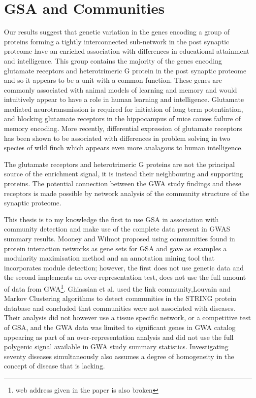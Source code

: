 	
\section{GSA and Communities}
Our results suggest that genetic variation in the genes encoding a group of proteins forming a tightly interconnected sub-network in the post synaptic proteome have an enriched association with differences in educational attainment and intelligence. This group contains the majority of the genes encoding glutamate receptors and heterotrimeric G protein in the post synaptic proteome and so it appears to be a unit with a common function. These genes are commonly associated with animal models of learning and memory and would intuitively appear to have a role in human learning and intelligence. Glutamate mediated neurotransmission is required for initiation of long term potentiation, and blocking glutamate receptors in the hippocampus of mice causes failure of memory encoding.  More recently, differential expression of glutamate receptors has been shown to be associated with differences in problem solving in two species of wild finch\cite{audet2018divergence} which appears even more analagous to human intelligence.   


The glutamate receptors and heterotrimeric G proteins are not the principal source of the enrichment signal, it is instead their neighbouring and supporting proteins. The potential connection between the GWA study findings and these receptors is made possible by network analysis of the community structure of the synaptic proteome.


This thesis is to my knowledge the first to use GSA in association with community detection and make use of the complete data present in GWAS summary results. Mooney and Wilmot proposed using communities found in protein interaction networks as gene sets for GSA\cite{mooney2015gene} and gave as examples a modularity maximisation method and an annotation mining tool that incorporates module detection; however, the first does not use genetic data \cite{xu2010module} and the second implements an over-representation test, does not use the full amount of data from GWA\footnote{web address given in the paper is also broken}\cite{cowley2012pina}. Ghiassian et al.\cite{ghiassian2015disease} used the link community\cite{ahn2010link},Louvain\cite{blondel2008fast} and Markov Clustering\cite{dongen2000graph} algorithms to detect communities in the STRING protein database and concluded that communities were not associated with diseases. Their analysis did not however use a tissue specific network, or a competitive test of GSA, and the GWA data was limited to significant genes in GWA catalog\cite{ghiassian2015disease} appearing as part of an over-representation analysis and did not use the full polygenic signal available in GWA study summary statistics.  Investigating seventy diseases simultaneously also assumes a degree of homogeneity in the concept of disease that is lacking. 

